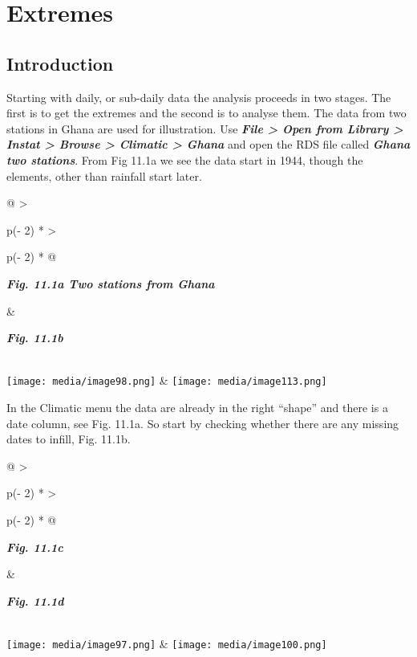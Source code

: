 \documentclass[
  letterpaper,
  DIV=11,
  numbers=noendperiod]{scrreprt}
\begin{document}

\chapter{Extremes}\label{extremes}

\section{Introduction}\label{introduction-10}

Starting with daily, or sub-daily data the analysis proceeds in two
stages. The first is to get the extremes and the second is to analyse
them. The data from two stations in Ghana are used for illustration. Use
\textbf{\emph{File \textgreater{} Open from Library \textgreater{}
Instat \textgreater{} Browse \textgreater{} Climatic \textgreater{}
Ghana}} and open the RDS file called \textbf{\emph{Ghana two stations}}.
From Fig 11.1a we see the data start in 1944, though the elements, other
than rainfall start later.

\begin{longtable}[]{@{}
  >{\raggedright\arraybackslash}p{(\columnwidth - 2\tabcolsep) * }
  >{\raggedright\arraybackslash}p{(\columnwidth - 2\tabcolsep) * }@{}}
\toprule\noalign{}
\begin{minipage}[b]{\linewidth}\raggedright
\textbf{\emph{Fig. 11.1a Two stations from Ghana}}
\end{minipage} & \begin{minipage}[b]{\linewidth}\raggedright
\textbf{\emph{Fig. 11.1b}}
\end{minipage} \\
\midrule\noalign{}
\endhead
\bottomrule\noalign{}
\endlastfoot
\texttt{[image: media/image98.png]} &
\texttt{[image: media/image113.png]} \\
\end{longtable}

In the Climatic menu the data are already in the right ``shape'' and
there is a date column, see Fig. 11.1a. So start by checking whether
there are any missing dates to infill, Fig. 11.1b.

\begin{longtable}[]{@{}
  >{\raggedright\arraybackslash}p{(\columnwidth - 2\tabcolsep) * }
  >{\raggedright\arraybackslash}p{(\columnwidth - 2\tabcolsep) * }@{}}
\toprule\noalign{}
\begin{minipage}[b]{\linewidth}\raggedright
\textbf{\emph{Fig. 11.1c}}
\end{minipage} & \begin{minipage}[b]{\linewidth}\raggedright
\textbf{\emph{Fig. 11.1d}}
\end{minipage} \\
\midrule\noalign{}
\endhead
\bottomrule\noalign{}
\endlastfoot
\texttt{[image: media/image97.png]} &
\texttt{[image: media/image100.png]} \\
\end{longtable}
\end{document}
